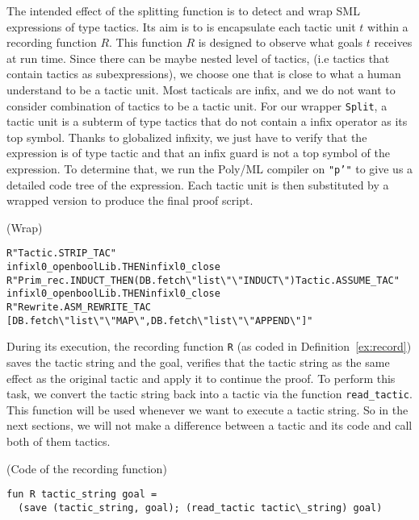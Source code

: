 \documentclass[runningheads,a4paper,draft]{svjour3}
\def\sml{\textsf{SML}\xspace}
\def\polyml{\textsf{Poly/ML}\xspace}
\newcommand{\bq}[1]{\textbackslash"{#1}\textbackslash"}
\begin{document}
The intended effect of the splitting function is to detect and wrap \sml 
expressions of type tactics. Its aim is to is encapsulate each tactic 
unit $t$ within a recording function $R$. This function $R$ is designed to 
observe what goals $t$ receives at run time. Since there can be maybe nested 
level of tactics, (i.e 
tactics that contain tactics as subexpressions), we choose one that is
close to what a human understand to be a tactic unit. 
Most tacticals are infix, and we do not want to consider combination of 
tactics to be a tactic unit. For our wrapper \texttt{Split}, a tactic unit is a 
subterm of 
type tactics that do not contain a infix operator as its top symbol. Thanks to
globalized infixity, we just have to verify that the expression 
is of type tactic and that an infix guard is not a top symbol of the expression.
To determine that, we run the \polyml compiler on \texttt{"p'"} to give us a 
detailed code tree of the expression. Each tactic unit is then substituted 
by a wrapped version to produce the final proof script.

\begin{example} (Wrap)
\begin{alltt}\small
R "Tactic.STRIP_TAC"
  infixl0_open boolLib.THEN infixl0_close
R "Prim_rec.INDUCT_THEN (DB.fetch \bq{list}\bq{INDUCT}) Tactic.ASSUME_TAC"
  infixl0_open boolLib.THEN infixl0_close
R "Rewrite.ASM_REWRITE_TAC 
     [DB.fetch \bq{list} \bq{MAP}, DB.fetch \bq{list} \bq{APPEND}]"
\end{alltt}
\end{example}   

During its execution, the recording function \texttt{R} (as coded in 
Definition~\ref{ex:record}) 
saves the tactic 
string and the goal, verifies that the tactic string as the same effect as the 
original tactic and apply it to continue the proof. To perform this task, we 
convert the tactic string back into a tactic via the function 
\texttt{read\_tactic}. This function will be used whenever we want to execute a 
tactic string. So in the next sections, we will not make a difference between a 
tactic and its code and call both of them tactics.


\begin{example}\label{ex:record} (Code of the recording function)
\begin{lstlisting}
fun R tactic_string goal = 
  (save (tactic_string, goal); (read_tactic tactic\_string) goal)
\end{lstlisting}
\end{example} 
\end{document}
